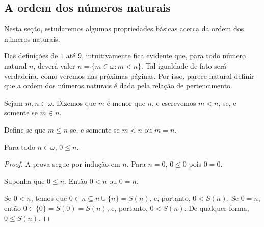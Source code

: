 \subsection{A ordem dos números naturais}\label{subsec:ordemDosNaturais}

Nesta seção, estudaremos algumas propriedades básicas acerca da ordem dos números naturais.

Das definições de $1$ até $9$, intuitivamente fica evidente que, para todo número natural $n$, deverá valer $n = \{m \in \omega: m<n\}$.
Tal igualdade de fato será verdadeira, como veremos nas próximas páginas.
Por isso, parece natural definir que a ordem dos números naturais é dada pela relação de pertencimento.

\begin{definition}[$Z^--P$]\label{def:ordemDosNaturais}
    Sejam $m, n \in \omega$.
    Dizemos que $m$ é menor que $n$, e escrevemos $m < n$, se, e somente se $m \in n$.

    Define-se que $m\leq n$ se, e somente se $m < n$ ou $m = n$.
\end{definition}

\begin{lemma}[$Z^--P$]\label{lem:zeroMenorIgualATodoNatural}
    Para todo $n \in \omega$, $0\leq n$.
\end{lemma}
\begin{proof}
    A prova segue por indução em $n$.
    Para $n=0$, $0\leq 0$ pois $0=0$.
    
    Suponha que $0\leq n$.
    Então $0<n$ ou $0=n$.

    Se $0<n$, temos que $0\in n\subseteq n\cup\{n\}=S(n)$, e, portanto, $0<S(n)$.
    Se $0=n$, então $0\in \{0\}=S(0)=S(n)$, e, portanto, $0<S(n)$.
    De qualquer forma, $0\leq S(n)$.
\end{proof}

